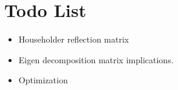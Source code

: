 \section{Todo List}

\begin{itemize}
    \item Householder reflection matrix
    \item Eigen decomposition matrix implications.
    \item Optimization
\end{itemize}